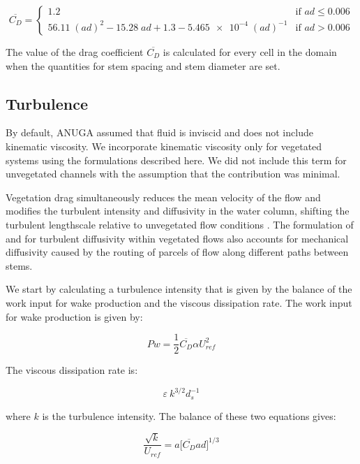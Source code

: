 \documentclass[10pt]{article}
\begin{document}
\[
 \overline{C_D} = 
  \begin{cases} 
   1.2 & \text{if } a d \leq 0.006 \\
   56.11\;(ad)^2 - 15.28\;ad + 1.3 - \num{5.465e-4}\;(ad)^{-1}       & \text{if } ad > 0.006
  \end{cases}
\]

The value of the drag coefficient $\overline{C_D}$ is calculated for every cell in the domain when the quantities for stem spacing and stem diameter are set.

\subsection{Turbulence}

By default, ANUGA assumed that fluid is inviscid and does not include kinematic viscosity. We incorporate kinematic viscosity only for vegetated systems using the formulations described here. We did not include this term for unvegetated channels with the assumption that the contribution was minimal.

Vegetation drag simultaneously reduces the mean velocity of the flow and modifies the turbulent intensity and diffusivity in the water column, shifting the turbulent lengthscale relative to unvegetated flow conditions \citep{nepf1997model}. The formulation of \citet{nepf1997model} and \citet{nepf1999drag} for turbulent diffusivity within vegetated flows also accounts for mechanical diffusivity caused by the routing of parcels of flow along different paths between stems.

We start by calculating a turbulence intensity that is given by the balance of the work input for wake production and the viscous dissipation rate. The work input for wake production is given by:

\begin{equation}
Pw = \frac{1}{2}\overline{C_D} \alpha U_{ref}^2
\end{equation}

The viscous dissipation rate is:

\begin{equation}
\varepsilon ~ k^{3/2} d_s^{-1}
\end{equation}

\noindent where $k$ is the turbulence intensity. The balance of these two equations gives:

\begin{equation}
\frac{\sqrt{k}}{U_{ref}} = a\big[\overline{C_D} ad\big]^{1/3}
\end{equation}
\end{document}
